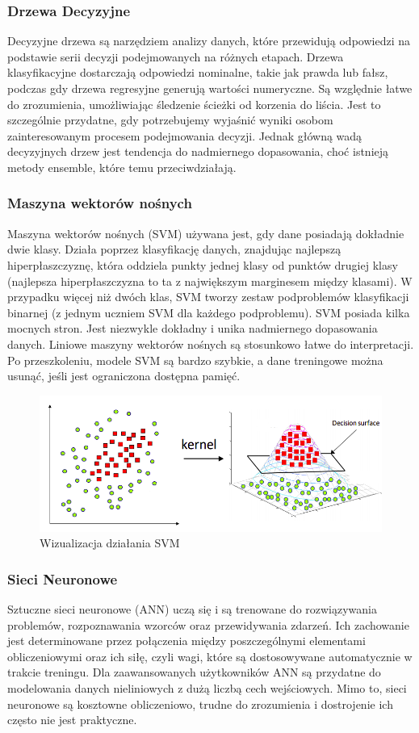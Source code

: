 \documentclass[12pt,a4paper]{article}
\begin{document}
\subsubsection{Drzewa Decyzyjne} 
Decyzyjne drzewa są narzędziem analizy danych, które przewidują odpowiedzi na podstawie serii decyzji podejmowanych na różnych etapach. Drzewa klasyfikacyjne dostarczają odpowiedzi nominalne, takie jak prawda lub fałsz, podczas gdy drzewa regresyjne generują wartości numeryczne. Są względnie łatwe do zrozumienia, umożliwiając śledzenie ścieżki od korzenia do liścia. Jest to szczególnie przydatne, gdy potrzebujemy wyjaśnić wyniki osobom zainteresowanym procesem podejmowania decyzji. Jednak główną wadą decyzyjnych drzew jest tendencja do nadmiernego dopasowania, choć istnieją metody ensemble, które temu przeciwdziałają. 

\subsubsection{Maszyna wektorów nośnych} 
Maszyna wektorów nośnych (SVM) używana jest, gdy dane posiadają dokładnie dwie klasy. Działa poprzez klasyfikację danych, znajdując najlepszą hiperpłaszczyznę, która oddziela punkty jednej klasy od punktów drugiej klasy (najlepsza hiperpłaszczyzna to ta z największym marginesem między klasami). W przypadku więcej niż dwóch klas, SVM tworzy zestaw podproblemów klasyfikacji binarnej (z jednym uczniem SVM dla każdego podproblemu). SVM posiada kilka mocnych stron. Jest niezwykle dokładny i unika nadmiernego dopasowania danych. Liniowe maszyny wektorów nośnych są stosunkowo łatwe do interpretacji. Po przeszkoleniu, modele SVM są bardzo szybkie, a dane treningowe można usunąć, jeśli jest ograniczona dostępna pamięć.

\begin{figure}[h]
    \centering
    \includegraphics[width=0.75\linewidth]{images/svm-visualization.png}
    \caption{Wizualizacja działania SVM \cite{svm-visualization}}
\end{figure}

\subsubsection{Sieci Neuronowe}
Sztuczne sieci neuronowe (ANN) uczą się i są trenowane do rozwiązywania problemów, rozpoznawania wzorców oraz przewidywania zdarzeń. Ich zachowanie jest determinowane przez połączenia między poszczególnymi elementami obliczeniowymi oraz ich siłę, czyli wagi, które są dostosowywane automatycznie w trakcie treningu. Dla zaawansowanych użytkowników ANN są przydatne do modelowania danych nieliniowych z dużą liczbą cech wejściowych. Mimo to, sieci neuronowe są kosztowne obliczeniowo, trudne do zrozumienia i dostrojenie ich często nie jest praktyczne. \cite{classification-models}
\end{document}
